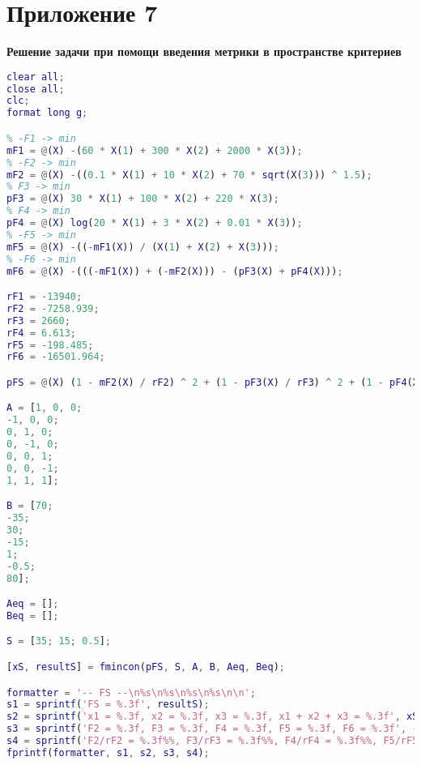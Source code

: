 \section*{Приложение 7} \label{p1:7}
\textbf{Решение задачи при помощи введения метрики в пространстве критериев}
\begin{lstlisting}[language={matlab}, caption={Решение задачи при помощи введения метрики в пространстве критериев}, label={lst:0}, basicstyle={\footnotesize\ttfamily}, breaklines={true}]
clear all;
close all; 
clc;
format long g;

% -F1 -> min
mF1 = @(X) -(60 * X(1) + 300 * X(2) + 2000 * X(3));
% -F2 -> min
mF2 = @(X) -((0.1 * X(1) + 10 * X(2) + 70 * sqrt(X(3))) ^ 1.5);
% F3 -> min
pF3 = @(X) 30 * X(1) + 100 * X(2) + 220 * X(3);
% F4 -> min
pF4 = @(X) log(20 * X(1) + 3 * X(2) + 0.01 * X(3));
% -F5 -> min
mF5 = @(X) -((-mF1(X)) / (X(1) + X(2) + X(3)));
% -F6 -> min
mF6 = @(X) -(((-mF1(X)) + (-mF2(X))) - (pF3(X) + pF4(X)));

rF1 = -13940;
rF2 = -7258.939;
rF3 = 2660;
rF4 = 6.613;
rF5 = -198.485;
rF6 = -16501.964;

pFS = @(X) (1 - mF2(X) / rF2) ^ 2 + (1 - pF3(X) / rF3) ^ 2 + (1 - pF4(X) / rF4) ^ 2 + (1 - mF5(X) / rF5) ^ 2 + (1 - mF6(X) / rF6) ^ 2;

A = [1, 0, 0;
-1, 0, 0;
0, 1, 0;
0, -1, 0;
0, 0, 1;
0, 0, -1;
1, 1, 1];

B = [70;
-35;
30;
-15;
1;
-0.5;
80];

Aeq = [];
Beq = [];

S = [35; 15; 0.5];

[xS, resultS] = fmincon(pFS, S, A, B, Aeq, Beq);

formatter = '-- FS --\n%s\n%s\n%s\n%s\n\n';
s1 = sprintf('FS = %.3f', resultS);
s2 = sprintf('x1 = %.3f, x2 = %.3f, x3 = %.3f, x1 + x2 + x3 = %.3f', xS, sum(xS));
s3 = sprintf('F2 = %.3f, F3 = %.3f, F4 = %.3f, F5 = %.3f, F6 = %.3f', -mF2(xS), pF3(xS), pF4(xS), -mF5(xS), -mF6(xS));
s4 = sprintf('F2/rF2 = %.3f%%, F3/rF3 = %.3f%%, F4/rF4 = %.3f%%, F5/rF5 = %.3f%%, F6/rF6 = %.3f%%', mF2(xS) / rF2 * 100, pF3(xS) / rF3 * 100, pF4(xS) / rF4 * 100, mF5(xS) / rF5 * 100, mF6(xS) / rF6 * 100);
fprintf(formatter, s1, s2, s3, s4);
\end{lstlisting}

